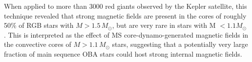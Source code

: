 When applied to more than 3000 red giants observed by the Kepler satellite, this technique revealed that strong magnetic fields are present in the cores of roughly 50\% of RGB stars with $M \! > \! 1.5 \, M_\odot$, but are very rare in stars with M $< 1.1M_\odot$ \citep{Stello_2016,Stello_2016a}. This is interpreted as the effect of MS core-dynamo-generated magnetic fields in the convective cores of $M \! > \! 1.1 \, M_\odot$ stars, suggesting that a potentially very large fraction of main sequence OBA stars could host strong internal magnetic fields.



